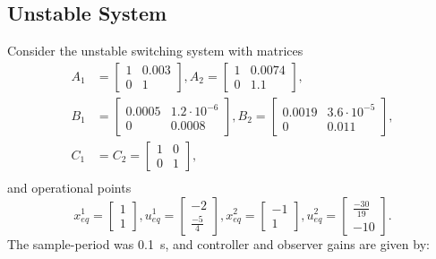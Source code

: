 \FloatBarrier

\subsection{Unstable System}%
\label{subsec:unstable-system}

Consider the unstable switching system with matrices
%
\begin{align*}
	A_1 & =
	\begin{bmatrix}
		1 & 0.003 \\
		0 & 1
	\end{bmatrix},
	A_2 = \begin{bmatrix}
		1 & 0.0074 \\
		0 & 1.1
	\end{bmatrix}, \\
	B_1 & =
	\begin{bmatrix}
		0.0005 & 1.2\cdot{}10^{-6} \\
		0      & 0.0008
	\end{bmatrix},
	B_2 = \begin{bmatrix}
		0.0019 & 3.6\cdot{}10^{-5} \\
		0      & 0.011
	\end{bmatrix}, \\
	C_1 & = C_2 =
	\begin{bmatrix}
		1 & 0 \\
		0 & 1
	\end{bmatrix},       \\
\end{align*}
%
and operational points
%
\[
	x_{eq}^1 = \begin{bmatrix}
		1 \\ 1
	\end{bmatrix},
	u_{eq}^1 = \begin{bmatrix}
		-2 \\ \frac{-5}{4}
	\end{bmatrix},
	x_{eq}^2 = \begin{bmatrix}
		-1 \\ 1
	\end{bmatrix},
	u_{eq}^2 = \begin{bmatrix}
		\frac{-30}{19} \\ -10
	\end{bmatrix}.
\]
%
The sample-period was \SI{0.1}{\second}, and controller and observer gains are
given by:
%
\scriptsize
